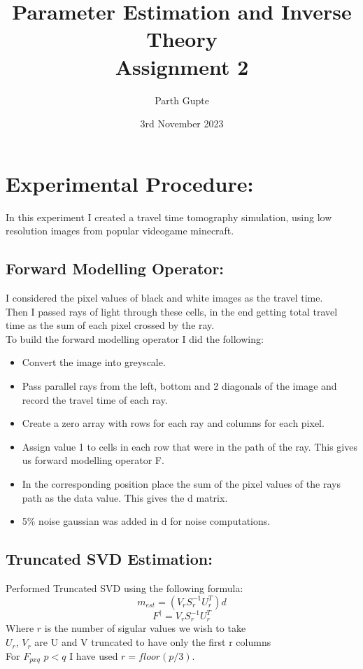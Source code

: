 \documentclass{article}
\title{Parameter Estimation and Inverse Theory\\ Assignment 2}
\author{Parth Gupte}
\date{3rd November 2023}
\begin{document}
\maketitle
\section{Experimental Procedure:}
In this experiment I created a travel time tomography simulation, using low resolution images from popular videogame minecraft.\\
\subsection{Forward Modelling Operator:}
I considered the pixel values of black and white images as the travel time.\\
Then I passed rays of light through these cells, in the end getting total travel time as the sum of each pixel crossed by the ray.\\
To build the forward modelling operator I did the following:
\begin{itemize}
    \item Convert the image into greyscale.
    \item Pass parallel rays from the left, bottom and 2 diagonals of the image and record the travel time of each ray.
    \item Create a zero array with rows for each ray and columns for each pixel.
    \item Assign value 1 to cells in each row that were in the path of the ray. This gives us forward modelling operator F.
    \item In the corresponding position place the sum of the pixel values of the rays path as the data value. This gives the d matrix.  
    \item 5\% noise gaussian was added in d for noise computations. 
\end{itemize}

\subsection{Truncated SVD Estimation:}
Performed Truncated SVD using the following formula:
\begin{displaymath}
    m_{est} = (V_rS_r^{-1}U_r^T)d 
\end{displaymath}
\begin{displaymath}
    F^{\dagger} = V_rS_r^{-1}U_r^T
\end{displaymath}
Where $r$ is the number of sigular values we wish to take\\
$U_r$, $V_r$ are U and V truncated to have only the first r columns\\
For $F_{pxq}$ $p<q$ I have used $r = floor(p/3)$.\\
\end{document}
